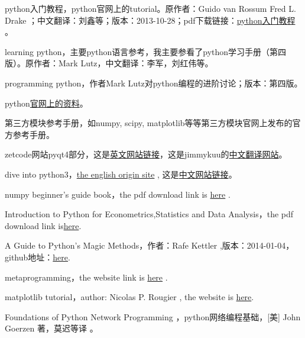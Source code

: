 \documentclass[12pt,oneside]{book}
\begin{document}
\begin{common-format}
\begin{thebibliography}{9}
 python入门教程，python官网上的tutorial。原作者：Guido van Rossum  Fred L. Drake ；中文翻译：刘鑫等；版本：2013-10-28；pdf下载链接：\href{https://drive.google.com/open?id=0ByWxOeitx54PSW40bU5zNVhuMlU&authuser=0}{python入门教程}  。

 learning python，主要python语言参考，我主要参看了python学习手册（第四版）。原作者：Mark Lutz，中文翻译：李军，刘红伟等。

 programming python，作者Mark Lutz对python编程的进阶讨论；版本：第四版。

 python\href{https://docs.python.org/3/}{官网上的资料}。

 第三方模块参考手册，如numpy, scipy, matplotlib等等第三方模块官网上发布的官方参考手册。

 zetcode网站pyqt4部分，这是\href{http://zetcode.com/gui/pyqt4/}{英文网站链接}，这是jimmykuu的\href{http://blog.cx125.com/books/PyQt4_Tutorial/}{中文翻译网站}。

 dive into python3，\href{http://www.diveintopython3.net/index.html}{the english origin site} , 这是\href{http://sebug.net/paper/books/dive-into-python3/index.html}{中文网站链接}。

 numpy beginner's guide book，the pdf download link is \href{https://drive.google.com/open?id=0ByWxOeitx54PNXRIMUVybTlLZDQ&authuser=0}{here} . 

 Introduction to Python for Econometrics,Statistics and Data Analysis，the pdf download link is\href{https://drive.google.com/open?id=0ByWxOeitx54PTXN6RW5ydzQ4YXc&authuser=0}{here}.

 A Guide to Python's Magic Methods，作者：Rafe Kettler ,版本：2014-01-04，github地址：\href{https://github.com/RafeKettler/magicmethods}{here}.

 metaprogramming，the website link is \href{http://python-3-patterns-idioms-test.readthedocs.org/en/latest/Metaprogramming.html}{here} .

 matplotlib tutorial，author: Nicolas P. Rougier , the website is  \href{http://www.labri.fr/perso/nrougier/teaching/matplotlib/}{here}.  

  Foundations of Python Network Programming ，python网络编程基础，[美] John Goerzen 著，莫迟等译 。


\end{thebibliography}




\end{common-format}
\end{document}
